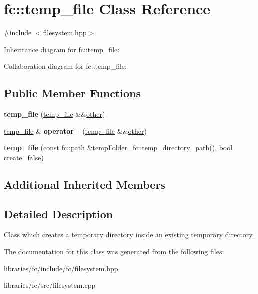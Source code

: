\hypertarget{classfc_1_1temp__file}{}\section{fc\+:\+:temp\+\_\+file Class Reference}
\label{classfc_1_1temp__file}


{\ttfamily \#include $<$filesystem.\+hpp$>$}



Inheritance diagram for fc\+:\+:temp\+\_\+file\+:


Collaboration diagram for fc\+:\+:temp\+\_\+file\+:
\subsection*{Public Member Functions}
\begin{DoxyCompactItemize}
\item 
\mbox{\label{classfc_1_1temp__file_a37fddc3a8cb16677958faa273501bcf9}} 
{\bfseries temp\+\_\+file} (\mbox{\hyperlink{classfc_1_1temp__file}{temp\+\_\+file}} \&\&\mbox{\hyperlink{structother}{other}})
\item 
\mbox{\label{classfc_1_1temp__file_ac241c440bacd13927eee3743843f13d5}} 
\mbox{\hyperlink{classfc_1_1temp__file}{temp\+\_\+file}} \& {\bfseries operator=} (\mbox{\hyperlink{classfc_1_1temp__file}{temp\+\_\+file}} \&\&\mbox{\hyperlink{structother}{other}})
\item 
\mbox{\label{classfc_1_1temp__file_aee3262a3b2a19b490f3f8da6fee49bc4}} 
{\bfseries temp\+\_\+file} (const \mbox{\hyperlink{classfc_1_1path}{fc\+::path}} \&temp\+Folder=fc\+::temp\+\_\+directory\+\_\+path(), bool create=false)
\end{DoxyCompactItemize}
\subsection*{Additional Inherited Members}


\subsection{Detailed Description}
\mbox{\hyperlink{class_class}{Class}} which creates a temporary directory inside an existing temporary directory. 

The documentation for this class was generated from the following files\+:\begin{DoxyCompactItemize}
\item 
libraries/fc/include/fc/filesystem.\+hpp\item 
libraries/fc/src/filesystem.\+cpp\end{DoxyCompactItemize}
